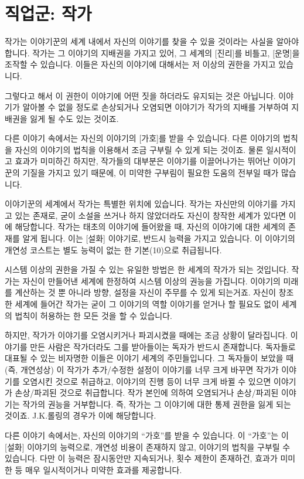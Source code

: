\documentclass[12pt]{report}
\newcommand{\world}[1]{{\nanumpen \large #1 \par}\bigskip}
\begin{document}
	\chapter{직업군: 작가}
	\world{작가는 이야기꾼의 세계 내에서 자신의 이야기를 찾을 수 있을 것이라는 사실을 알아야 합니다. 작가는 그 이야기의 지배권을 가지고 있어, 그 세계의 [진리]를 비틀고, [운명]을 조작할 수 있습니다. 이들은 자신의 이야기에 대해서는 저 이상의 권한을 가지고 있습니다.}
	\world{그렇다고 해서 이 권한이 이야기에 어떤 짓을 하더라도 유지되는 것은 아닙니다. 이야기가 알아볼 수 없을 정도로 손상되거나 오염되면 이야기가 작가의 지배를 거부하여 지배권을 잃게 될 수도 있는 것이죠.}
	\world{다른 이야기 속에서는 자신의 이야기의 [가호]를 받을 수 있습니다. 다른 이야기의 법칙을 자신의 이야기의 법칙을 이용해서 조금 구부릴 수 있게 되는 것이죠. 물론 일시적이고 효과가 미미하긴 하지만, 작가들의 대부분은 이야기를 이끌어나가는 뛰어난 이야기꾼의 기질을 가지고 있기 때문에, 이 미약한 구부림이 필요한 도움의 전부일 때가 많습니다.}
	
	이야기꾼의 세계에서 작가는 특별한 위치에 있습니다. 작가는 자신만의 이야기를 가지고 있는 존재로, 굳이 소설을 쓰거나 하지 않았더라도 자신이 창작한 세계가 있다면 이에 해당합니다.
	작가는 태초의 이야기에 들어왔을 때, 자신의 이야기에 대한 세계의 존재를 알게 됩니다. 이는 [설화] 이야기로, 반드시 능력을 가지고 있습니다. 이 이야기의 개연성 코스트는 별도 능력이 없는 한 기본(10)으로 취급됩니다.
	
	시스템 이상의 권한을 가질 수 있는 유일한 방법은 한 세계의 작가가 되는 것입니다. 작가는 자신이 만들어낸 세계에 한정하여 시스템 이상의 권능을 가집니다. 이야기의 미래를 계산하는 것 뿐 아니라 방향, 설정을 자신이 주무를 수 있게 되는거죠. 자신이 창조한 세계에 들어간 작가는 굳이 그 이야기의 역할 이야기를 얻거나 할 필요도 없이 세계의 법칙이 허용하는 한 모든 것을 할 수 있습니다.
	
	하지만, 작가가 이야기를 오염시키거나 파괴시켰을 때에는 조금 상황이 달라집니다. 이야기를 만든 사람은 작가더라도 그를 받아들이는 독자가 반드시 존재합니다. 독자들로 대표될 수 있는 비자명한 이들은 이야기 세계의 주민들입니다. 그 독자들이 보았을 때(즉, 개연성상) 이 작가가 추가/수정한 설정이 이야기를 너무 크게 바꾸면 작가가 이야기를 오염시킨 것으로 취급하고, 이야기의 진행 등이 너무 크게 바뀔 수 있으면 이야기가 손상/파괴된 것으로 취급합니다.
	작가 본인에 의하여 오염되거나 손상/파괴된 이야기는 작가의 권능을 거부합니다. 즉, 작가는 그 이야기에 대한 통제 권한을 잃게 되는 것이죠. J.K.롤링의 경우가 이에 해당합니다.
	
	다른 이야기 속에서는, 자신의 이야기의 “가호”를 받을 수 있습니다. 이 “가호”는 이 [설화] 이야기의 능력으로, 개연성 비용이 존재하지 않고, 이야기의 법칙을 구부릴 수 있습니다. 다만 이 능력은 잠시동안만 지속되거나, 횟수 제한이 존재하건, 효과가 미미한 등 매우 일시적이거나 미약한 효과를 제공합니다.
	
\end{document}
